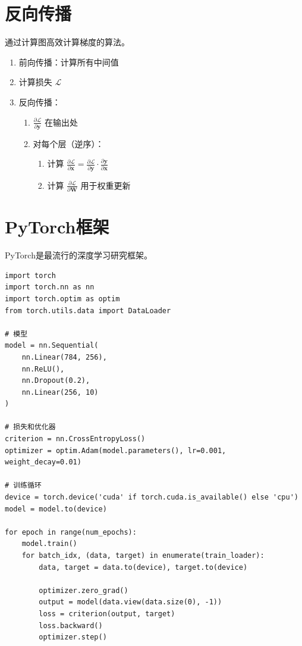 \section{反向传播}

通过计算图高效计算梯度的算法。

\begin{algorithm}[反向传播]
\begin{enumerate}
    \item 前向传播：计算所有中间值
    \item 计算损失 $\mathcal{L}$
    \item 反向传播：
    \begin{enumerate}
        \item $\frac{\partial \mathcal{L}}{\partial \mathbf{y}}$ 在输出处
        \item 对每个层（逆序）：
        \begin{enumerate}
            \item 计算 $\frac{\partial \mathcal{L}}{\partial \mathbf{x}} = \frac{\partial \mathcal{L}}{\partial \mathbf{y}} \cdot \frac{\partial \mathbf{y}}{\partial \mathbf{x}}$
            \item 计算 $\frac{\partial \mathcal{L}}{\partial \mathbf{W}}$ 用于权重更新
        \end{enumerate}
    \end{enumerate}
\end{enumerate}
\end{algorithm}

\section{PyTorch框架}

PyTorch是最流行的深度学习研究框架。

\begin{code}
    \label{code:training_chinese}
\begin{verbatim}
import torch
import torch.nn as nn
import torch.optim as optim
from torch.utils.data import DataLoader

# 模型
model = nn.Sequential(
    nn.Linear(784, 256),
    nn.ReLU(),
    nn.Dropout(0.2),
    nn.Linear(256, 10)
)

# 损失和优化器
criterion = nn.CrossEntropyLoss()
optimizer = optim.Adam(model.parameters(), lr=0.001, weight_decay=0.01)

# 训练循环
device = torch.device('cuda' if torch.cuda.is_available() else 'cpu')
model = model.to(device)

for epoch in range(num_epochs):
    model.train()
    for batch_idx, (data, target) in enumerate(train_loader):
        data, target = data.to(device), target.to(device)
        
        optimizer.zero_grad()
        output = model(data.view(data.size(0), -1))
        loss = criterion(output, target)
        loss.backward()
        optimizer.step()
\end{verbatim}
\end{code}

